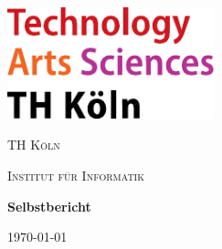 
\begin{titlepage}
	\centering
	\includegraphics[width=0.45\textwidth]{../../../assets/logo_th_koeln.pdf}\par\vspace{1cm}
	{\scshape\LARGE TH Köln \par}
	\vspace{1cm}
	{\scshape\Large Institut für Informatik\par}
	\vspace{1.5cm}
	{\huge\bfseries Selbstbericht\par}

	\vfill

	{\large \today\par}
\end{titlepage}